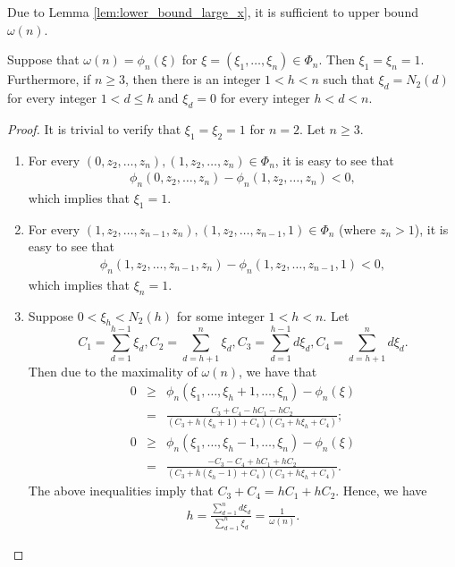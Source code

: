 \documentclass[JMC]{degruyter-journal}
\begin{document}
Due to Lemma \ref{lem:lower_bound_large_x}, it is sufficient  to
upper bound $\omega(n)$.
\begin{lemma}\label{lem:omega_maximality}
Suppose that $\omega(n)=\phi_n(\xi)$ for
$\xi=(\xi_1,\ldots,\xi_n)\in \Phi_n$. Then  $\xi_1= \xi_n=1$.
Furthermore, if $n\geq 3$, then there is an integer $1<h<n$ such
that $\xi_d=N_2(d)$ for every integer $1<d\leq h$ and $\xi_d=0$ for
every integer     $h<d<n$.
\end{lemma}
\begin{proof}
It is trivial to verify that $\xi_1=\xi_2=1$ for $n=2$. Let $n\geq 3$.

\begin{enumerate}
\item  For every $(0,z_2,\ldots,z_n), (1,z_2,\ldots,z_n)\in \Phi_n$, it is easy to see that
\begin{eqnarray*}
\phi_n(0, z_2,\ldots, z_n)-\phi_n(1,z_2,\ldots,
z_n)<0,
\end{eqnarray*}
which implies that  $\xi_1=1$.


\item For every $(1,z_2,\ldots, z_{n-1}, z_n), (1,z_2,\ldots, z_{n-1},1)\in
\Phi_n$ (where $z_n >1$), it is easy to see that
\begin{eqnarray*}
\phi_n(1,z_2, \ldots, z_{n-1}, z_n)-\phi_n(1,z_2,\ldots,z_{n-1}, 1)
 < 0,
\end{eqnarray*}
which implies that $\xi_n=1$.



\item Suppose  $0<\xi_h<N_2(h)$ for some integer $1<h<n$.  Let
$$C_1=\sum_{d=1}^{h-1}\xi_d, C_2=\sum_{d=h+1}^n\xi_d, C_3=\sum_{d=1}^{h-1}d\xi_d,
C_4=\sum_{d=h+1}^nd\xi_d.$$ Then due to the maximality of
$\omega(n)$, we have that
\begin{eqnarray*}\label{eqn:det_h_1}
0&\geq& \phi_n(\xi_1,\ldots, \xi_h+1, \ldots, \xi_n)-\phi_n(\xi)\\
 &=&
\frac{C_3+C_4-hC_1-hC_2}{(C_3+h(\xi_h+1)+C_4)(C_3+h\xi_h+C_4)};
\end{eqnarray*}
\begin{eqnarray*}\label{eqn:det_h_2}
0&\geq& \phi_n(\xi_1,\ldots, \xi_h-1, \ldots, \xi_n)-\phi_n(\xi) \\
&=&
\frac{-C_3-C_4+hC_1+hC_2}{(C_3+h(\xi_h-1)+C_4)(C_3+h\xi_h+C_4)}.
\end{eqnarray*}
The above inequalities  imply that
$C_3+C_4=hC_1+hC_2$. Hence, we have
 \begin{eqnarray*}\label{eqn:value_h}
h=\frac{\sum_{d=1}^n d\xi_d}{\sum_{d=1}^n
\xi_d}=\frac{1}{\omega(n)}.
 \end{eqnarray*}




\end{enumerate}
\end{proof}
\end{document}
